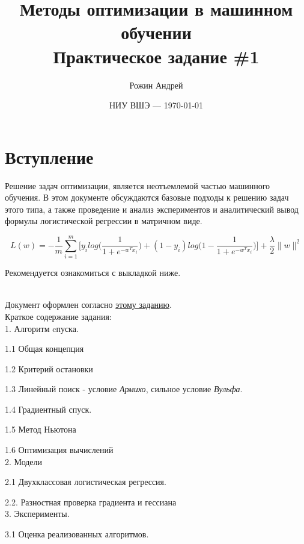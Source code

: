 \documentclass{article}
\title{Методы оптимизации в машинном обучении \\ Практическое задание \#1} %
\author{Рожин Андрей} %
\date{НИУ ВШЭ --- \today} %
\begin{document}
	
	\maketitle %
	
	
	\section*{Вступление} %
	Решение задач оптимизации, является неотъемлемой частью машинного обучения. В этом документе обсуждаются базовые подходы к решению задач этого типа, а также проведение и анализ экспериментов и аналитический вывод формулы логистической регрессии в матричном виде.
	
	\begin{equation}
		L(w) = - \frac{1}{m} \sum\limits_{i=1}^m \biggl[y_i log\biggl(\frac{1}{1 + e^{-w^Tx_i}}\biggr) + (1 - y_i) log\biggl(1 - \frac{1}{1 + e^{-w^Tx_i}}\biggr)\biggr] + \frac{\lambda}{2} \|w\|^2
	\end{equation}
	
	Рекомендуется ознакомиться с выкладкой ниже.
	
	\begin{info} %
		\\
		Документ оформлен согласно  \href{https://clck.ru/h2bZh}{этому заданию}.\\ 
		Краткое содержание задания: \\
		1. Алгоритм cпуска.
		
		1.1 Общая концепция
		
		1.2 Критерий остановки
		
		1.3 Линейный поиск - условие \textit{Армихо}, сильное условие \textit{Вульфа}.
		
		1.4 Градиентный спуск.
		
		1.5 Метод Ньютона
		
		1.6 Оптимизация вычислений \\
		2. Модели
		
		2.1 Двухклассовая логистическая регрессия.
		
		2.2. Разностная проверка градиента и гессиана \\
		3. Эксперименты.
		
		3.1 Оценка реализованных алгоритмов.		
	\end{info}
	
\end{document}
